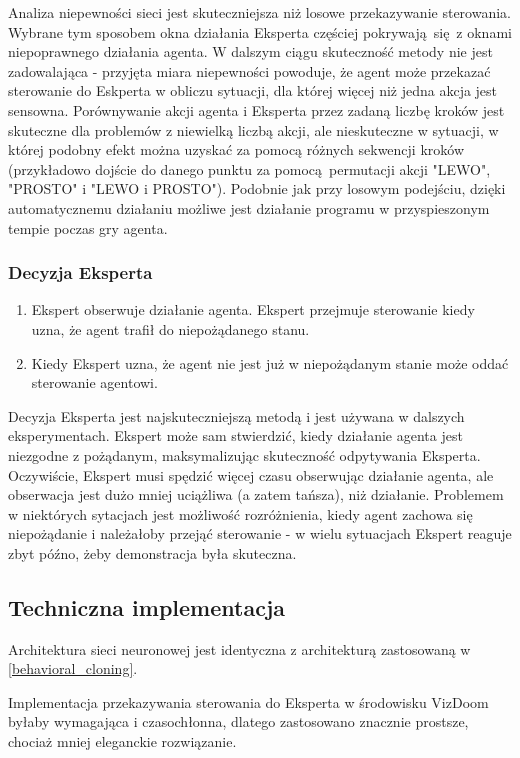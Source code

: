 Analiza niepewności sieci jest skuteczniejsza niż losowe przekazywanie sterowania. Wybrane tym sposobem okna działania Eksperta częściej pokrywają się z oknami niepoprawnego działania agenta. W dalszym ciągu skuteczność metody nie jest zadowalająca - przyjęta miara niepewności powoduje, że agent może przekazać sterowanie do Eskperta w obliczu sytuacji, dla której więcej niż jedna akcja jest sensowna. Porównywanie akcji agenta i Eksperta przez zadaną liczbę kroków jest skuteczne dla problemów z niewielką liczbą akcji, ale nieskuteczne w sytuacji, w której podobny efekt można uzyskać za pomocą różnych sekwencji kroków (przykładowo dojście do danego punktu za pomocą permutacji akcji "LEWO", "PROSTO" i "LEWO i PROSTO"). Podobnie jak przy losowym podejściu, dzięki automatycznemu działaniu możliwe jest działanie programu w przyspieszonym tempie poczas gry agenta.

\subsubsection{Decyzja Eksperta}\label{expert_call}
\begin{enumerate}
\item Ekspert obserwuje działanie agenta. Ekspert przejmuje sterowanie kiedy uzna, że agent trafił do niepożądanego stanu.
\item Kiedy Ekspert uzna, że agent nie jest już w niepożądanym stanie może oddać sterowanie agentowi.
\end{enumerate}

Decyzja Eksperta jest najskuteczniejszą metodą i jest używana w dalszych eksperymentach. Ekspert może sam stwierdzić, kiedy działanie agenta jest niezgodne z pożądanym, maksymalizując skuteczność odpytywania Eksperta. Oczywiście, Ekspert musi spędzić więcej czasu obserwując działanie agenta, ale obserwacja jest dużo mniej uciążliwa (a zatem tańsza), niż działanie. Problemem w niektórych sytacjach jest możliwość rozróżnienia, kiedy agent zachowa się niepożądanie i należałoby przejąć sterowanie - w wielu sytuacjach Ekspert reaguje zbyt późno, żeby demonstracja była skuteczna.

\subsection{Techniczna implementacja}

Architektura sieci neuronowej jest identyczna z architekturą zastosowaną w \ref{behavioral_cloning}.

Implementacja przekazywania sterowania do Eksperta w środowisku VizDoom byłaby wymagająca i czasochłonna, dlatego zastosowano znacznie prostsze, chociaż mniej eleganckie rozwiązanie.

